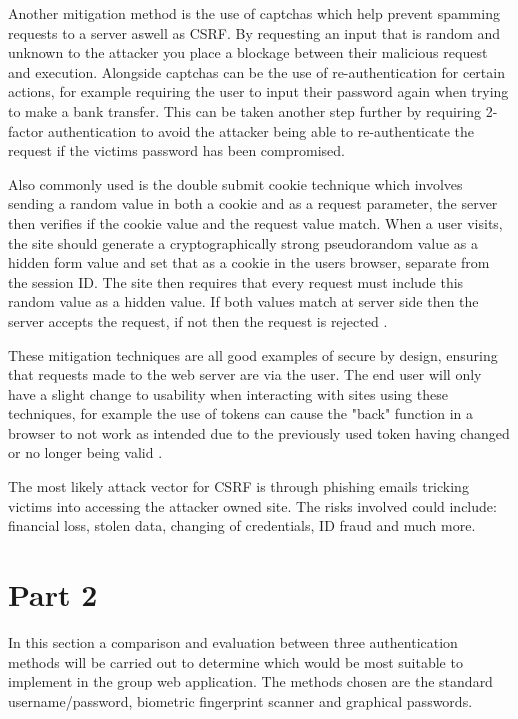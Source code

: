 \documentclass{ueacmpstyle}
\begin{document}
      Another mitigation method is the use of captchas which help prevent spamming requests 
      to a server aswell as CSRF. By requesting an input that is random and unknown to the 
      attacker you place a blockage between their malicious request and execution. 
      Alongside captchas can be the use of re-authentication for certain actions, for example 
      requiring the user to input their password again when trying to make a bank transfer. 
      This can be taken another step further by requiring 2-factor authentication to avoid 
      the attacker being able to re-authenticate the request if the victims password has been 
      compromised.

      Also commonly used is the double submit cookie technique which involves sending a random 
      value in both a cookie and as a request parameter, the server then verifies if the 
      cookie value and the request value match. When a user visits, the site should generate 
      a cryptographically strong pseudorandom value as a hidden form value and set that as 
      a cookie in the users browser, separate from the session ID. The site then requires that 
      every request must include this random value as a hidden value. If both values match at 
      server side then the server accepts the request, if not then the request is rejected 
      \citep{OWASPCSRFPrevention}.

      These mitigation techniques are all good examples of secure by design, ensuring that 
      requests made to the web server are via the user. The end user will only have a slight 
      change to usability when interacting with sites using these techniques, for example the 
      use of tokens can cause the "back" function in a browser to not work as intended due to 
      the previously used token having changed or no longer being valid \citep{OWASPCSRFPrevention}.
      
      The most likely attack vector for CSRF is through phishing emails tricking victims into 
      accessing the attacker owned site. The risks involved could include: financial loss, 
      stolen data, changing of credentials, ID fraud and much more. 
        
    \newpage
    \section{Part 2}\label{sec:Pt2}
    In this section a comparison and evaluation between three authentication methods will 
    be carried out to determine which would be most suitable to implement in the group web 
    application. The methods chosen are the standard username/password, biometric 
    fingerprint scanner and graphical passwords.
    
\end{document}
